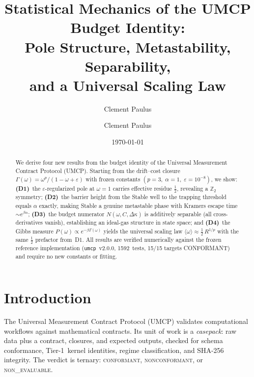 \documentclass[
  aps,
  prd,
  twocolumn,
  showpacs,
  superscriptaddress,
  nofootinbib,
  floatfix
]{revtex4-2}
\newcommand{\Gam}{\Gamma}
\newcommand{\eps}{\varepsilon}
\begin{document}
\title{Statistical Mechanics of the UMCP Budget Identity:\\
Pole Structure, Metastability, Separability,\\
and a Universal Scaling Law}

\author{Clement Paulus}

\author{Clement Paulus}

\date{\today}

\begin{abstract}
We derive four new results from the budget identity of the
Universal Measurement Contract Protocol (UMCP).  Starting
from the drift--cost closure $\Gam(\omega)=\omega^{p}/(1-\omega+\eps)$
with frozen constants $(p{=}3,\;\alpha{=}1,\;\eps{=}10^{-8})$, we show:
\textbf{(D1)}~the $\eps$-regularized pole at $\omega{=}1$ carries effective
residue $\tfrac{1}{2}$, revealing a $\mathbb{Z}_2$ symmetry;
\textbf{(D2)}~the barrier height from the Stable well to the trapping
threshold equals $\alpha$ exactly, making Stable a genuine metastable
phase with Kramers escape time $\sim e^{\beta\alpha}$;
\textbf{(D3)}~the budget numerator $N(\omega,C,\Delta\kappa)$ is
additively separable (all cross-derivatives vanish), establishing an
ideal-gas structure in state space; and
\textbf{(D4)}~the Gibbs measure $P(\omega)\propto e^{-\beta\Gam(\omega)}$
yields the universal scaling law
$\langle\omega\rangle\approx\tfrac{1}{2}\,R^{1/p}$
with the same $\tfrac{1}{2}$ prefactor from~D1.
All results are verified numerically against the frozen reference
implementation (\texttt{umcp}~v2.0.0, 1592~tests, 15/15 targets
CONFORMANT) and require no new constants or fitting.
\end{abstract}

\maketitle

\section{Introduction}\label{sec:intro}

The Universal Measurement Contract Protocol (UMCP)
\cite{paulus2025umcp,paulus2025physicscoherence}
validates computational workflows against mathematical contracts.
Its unit of work is a \emph{casepack}: raw data plus a contract,
closures, and expected outputs, checked for schema conformance,
Tier-1~kernel identities, regime classification, and SHA-256
integrity.  The verdict is ternary:
\textsc{conformant}, \textsc{nonconformant}, or
\textsc{non\_evaluable}.
\end{document}
